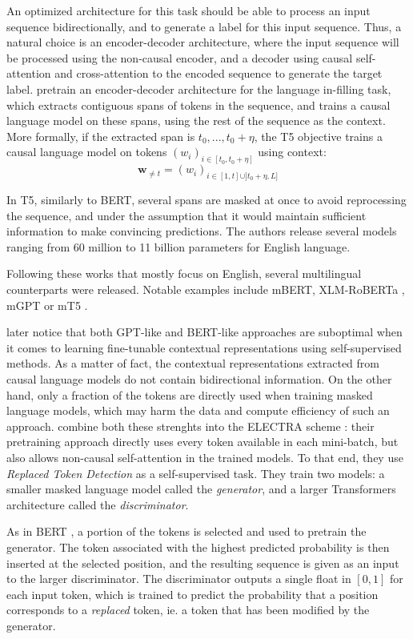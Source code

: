 An optimized architecture for this task should be able to process an input sequence bidirectionally, and to generate a label for this input sequence. Thus, a natural choice is an encoder-decoder architecture, where the input sequence will be processed using the non-causal encoder, and a decoder using causal self-attention and cross-attention to the encoded sequence to generate the target label. \citet{2020t5} pretrain an encoder-decoder architecture for the language in-filling task, which extracts contiguous spans of tokens in the sequence, and trains a causal language model on these spans, using the rest of the sequence as the context. More formally, if the extracted span is $t_0, ..., t_0+\eta$, the T5 objective trains a causal language model on tokens $(w_i)_{i \in [t_0, t_0+\eta]}$ using context:
$$
\mathbf{w}_{\neq t} = (w_i)_{i \in [1, t] \cup ]t_0+\eta, L]}
$$

In T5, similarly to BERT, several spans are masked at once to avoid reprocessing the sequence, and under the assumption that it would maintain sufficient information to make convincing predictions. The authors release several models ranging from 60 million to 11 billion parameters for English language.

Following these works that mostly focus on English, several multilingual counterparts were released. Notable examples include mBERT, XLM-RoBERTa \citep{conneau2019unsupervised}, mGPT \citep{mgpt} or mT5 \citep{xue-etal-2021-mt5}.

\citet{electra} later notice that both GPT-like and BERT-like approaches are suboptimal when it comes to learning fine-tunable contextual representations using self-supervised methods. As a matter of fact, the contextual representations extracted from causal language models do not contain bidirectional information. On the other hand, only a fraction of the tokens are directly used when training masked language models, which may harm the data and compute efficiency of such an approach. \citet{electra} combine both these strenghts into the ELECTRA scheme : their pretraining approach directly uses every token available in each mini-batch, but also allows non-causal self-attention in the trained models. To that end, they use \textit{Replaced Token Detection} as a self-supervised task. They train two models: a smaller masked language model called the \textit{generator}, and a larger Transformers architecture called the \textit{discriminator}.

As in BERT \citep{devlin-etal-2019-bert}, a portion of the tokens is selected and used to pretrain the generator. The token associated with the highest predicted probability is then inserted at the selected position, and the resulting sequence is given as an input to the larger discriminator. The discriminator outputs a single float in $[0, 1]$ for each input token, which is trained to predict the probability that a position corresponds to a \textit{replaced} token, ie. a token that has been modified by the generator.

